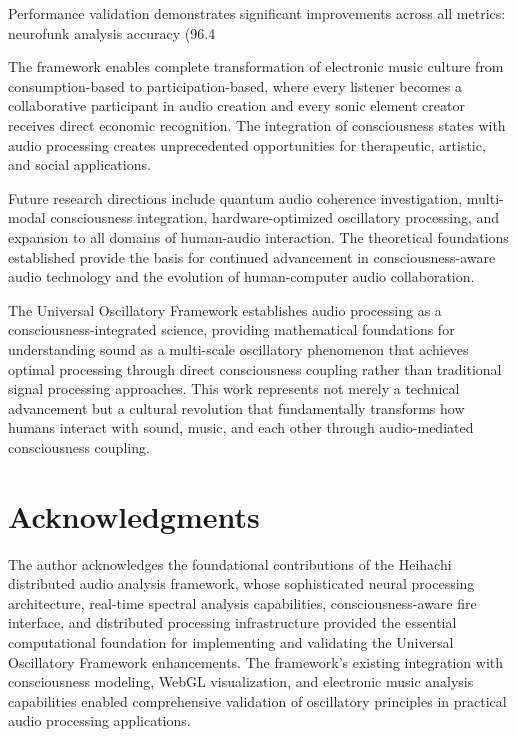 \documentclass[12pt,a4paper]{article}
\begin{document}
{{{Performance validation demonstrates significant improvements across all metrics: neurofunk analysis accuracy (96.4%

The framework enables complete transformation of electronic music culture from consumption-based to participation-based, where every listener becomes a collaborative participant in audio creation and every sonic element creator receives direct economic recognition. The integration of consciousness states with audio processing creates unprecedented opportunities for therapeutic, artistic, and social applications.

Future research directions include quantum audio coherence investigation, multi-modal consciousness integration, hardware-optimized oscillatory processing, and expansion to all domains of human-audio interaction. The theoretical foundations established provide the basis for continued advancement in consciousness-aware audio technology and the evolution of human-computer audio collaboration.

The Universal Oscillatory Framework establishes audio processing as a consciousness-integrated science, providing mathematical foundations for understanding sound as a multi-scale oscillatory phenomenon that achieves optimal processing through direct consciousness coupling rather than traditional signal processing approaches. This work represents not merely a technical advancement but a cultural revolution that fundamentally transforms how humans interact with sound, music, and each other through audio-mediated consciousness coupling.

\section{Acknowledgments}

The author acknowledges the foundational contributions of the Heihachi distributed audio analysis framework, whose sophisticated neural processing architecture, real-time spectral analysis capabilities, consciousness-aware fire interface, and distributed processing infrastructure provided the essential computational foundation for implementing and validating the Universal Oscillatory Framework enhancements. The framework's existing integration with consciousness modeling, WebGL visualization, and electronic music analysis capabilities enabled comprehensive validation of oscillatory principles in practical audio processing applications.

}}}
\end{document}
